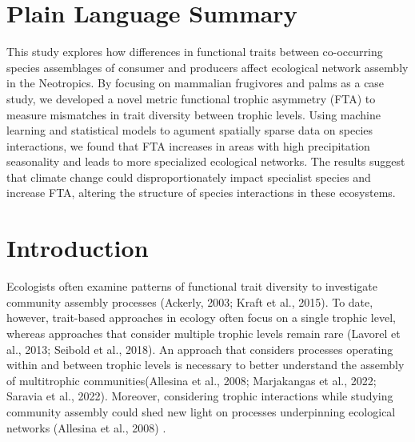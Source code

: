 \documentclass[
]{agujournal2019}
\begin{document}
\section*{Plain Language Summary}
This study explores how differences in functional traits between
co-occurring species assemblages of consumer and producers affect
ecological network assembly in the Neotropics. By focusing on mammalian
frugivores and palms as a case study, we developed a novel metric
functional trophic asymmetry (FTA) to measure mismatches in trait
diversity between trophic levels. Using machine learning and statistical
models to agument spatially sparse data on species interactions, we
found that FTA increases in areas with high precipitation seasonality
and leads to more specialized ecological networks. The results suggest
that climate change could disproportionately impact specialist species
and increase FTA, altering the structure of species interactions in
these ecosystems.



\section{Introduction}\label{introduction}

Ecologists often examine patterns of functional trait diversity to
investigate community assembly processes (Ackerly, 2003; Kraft et al.,
2015). To date, however, trait-based approaches in ecology often focus
on a single trophic level, whereas approaches that consider multiple
trophic levels remain rare (Lavorel et al., 2013; Seibold et al., 2018).
An approach that considers processes operating within and between
trophic levels is necessary to better understand the assembly of
multitrophic communities(Allesina et al., 2008; Marjakangas et al.,
2022; Saravia et al., 2022). Moreover, considering trophic interactions
while studying community assembly could shed new light on processes
underpinning ecological networks (Allesina et al., 2008) .
\end{document}
